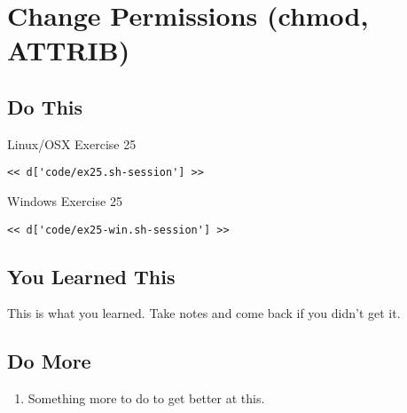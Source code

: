 \chapter{Change Permissions (chmod, ATTRIB)}

\section{Do This}

\begin{code}{Linux/OSX Exercise 25}
\begin{Verbatim}
<< d['code/ex25.sh-session'] >>
\end{Verbatim}
\end{code}

\begin{code}{Windows Exercise 25}
\begin{Verbatim}
<< d['code/ex25-win.sh-session'] >>
\end{Verbatim}
\end{code}

\section{You Learned This}

This is what you learned.  Take notes and come back if you didn't get it.

\section{Do More}

\begin{enumerate}
\item Something more to do to get better at this.
\end{enumerate}

